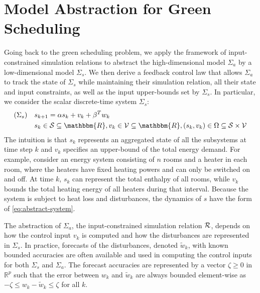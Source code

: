 \section{Model Abstraction for Green\\Scheduling}
\label{sec:abstraction-gs}

Going back to the green scheduling problem, we apply the framework of input-constrained simulation relations to abstract the high-dimensional model $\Sigma_{a}$ by a low-dimensional model $\Sigma_{s}$.
We then derive a feedback control law that allows $\Sigma_{a}$ to track the state of $\Sigma_{s}$ while maintaining their simulation relation, all their state and input constraints, as well as the input upper-bounds set by $\Sigma_{s}$.
In particular, we consider the scalar discrete-time system $\Sigma_{s}$:
\begin{align}
  (\Sigma_s) \quad
  & s_{k + 1} = \alpha s_k + v_k + \beta^T w_{k}   \label{eq:abstract-system} \\
  & s_k \in \SSet \subseteq \mathbbm{R},
  v_k \in \VSet \subseteq \mathbbm{R},
  (s_k, v_k) \in \Omega \subseteq \SSet \times \VSet \nonumber
 \end{align}
%
The intuition is that $s_{k}$ represents an aggregated state of all the subsystems at time step $k$ and $v_{k}$ specifies an upper-bound of the total energy demand.
For example, consider an energy system consisting of $n$ rooms and a heater in each room, where the heaters have fixed heating powers and can only be switched on and off.
At time $k$, $s_{k}$ can represent the total enthalpy of all rooms, while $v_{k}$ bounds the total heating energy of all heaters during that interval.
Because the system is subject to heat loss and disturbances, the dynamics of $s$ have the form of \eqref{eq:abstract-system}.

The abstraction of $\Sigma_{a}$, \ie the input-constrained simulation relation $\mathcal{R}$, depends on how the control input $v_{k}$ is computed and how the disturbances are represented in $\Sigma_{s}$.
In practice, forecasts of the disturbances, denoted $\tilde{w}_{k}$, with known bounded accuracies are often available and used in computing the control inputs for both $\Sigma_{s}$ and $\Sigma_{a}$.
The forecast accuracies are represented by a vector $\zeta \geq 0$ in $\mathbb{R}^{p}$ such that the error between $w_{k}$ and $\tilde{w}_{k}$ are always bounded element-wise as $-\zeta \leqslant w_{k} - \tilde{w}_{k} \leqslant \zeta$ for all $k$.

